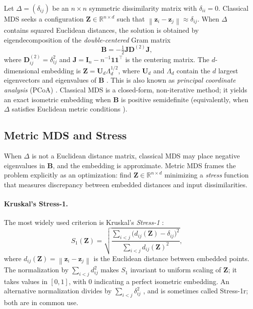 \documentclass[twoside,11pt]{article}
\newcommand{\R}{\mathbb{R}}
\newcommand{\bz}{\mathbf{z}}
\newcommand{\bZ}{\mathbf{Z}}
\newcommand{\bD}{\mathbf{D}}
\newcommand{\bB}{\mathbf{B}}
\newcommand{\bI}{\mathbf{I}}
\newcommand{\bJ}{\mathbf{J}}
\newcommand{\bU}{\mathbf{U}}
\newcommand{\norm}[1]{\left\|#1\right\|}
\newcommand{\StressOne}{S_1}
\begin{document}
Let $\Delta = (\delta_{ij})$ be an $n \times n$ symmetric dissimilarity
matrix with $\delta_{ii} = 0$.  Classical MDS
\citep{torgerson1952multidimensional, young1938discussion} seeks a
configuration $\bZ \in \R^{n \times d}$ such that
$\norm{\bz_i - \bz_j} \approx \delta_{ij}$.  When $\Delta$ contains
squared Euclidean distances, the solution is obtained by eigendecomposition
of the \emph{double-centered} Gram matrix
\begin{equation}
  \bB = -\tfrac{1}{2} \bJ \bD^{(2)} \bJ,
  \label{eq:gram}
\end{equation}
where $\bD^{(2)}_{ij} = \delta_{ij}^2$ and
$\bJ = \bI_n - n^{-1}\mathbf{1}\mathbf{1}^\top$ is the centering matrix.
The $d$-dimensional embedding is
$\bZ = \bU_d \Lambda_d^{1/2}$, where $\bU_d$ and $\Lambda_d$ contain the
$d$ largest eigenvectors and eigenvalues of $\bB$
\citep{eckart1936approximation, gower1966some}.
This is also known as \emph{principal coordinate analysis} (PCoA)
\citep{gower1966some}.  Classical MDS is a closed-form, non-iterative
method; it yields an exact isometric embedding when $\bB$ is positive
semidefinite (equivalently, when $\Delta$ satisfies Euclidean metric
conditions \citep{schoenberg1935remarks}).

\subsection{Metric MDS and Stress}
\label{sec:metric_mds}

When $\Delta$ is not a Euclidean distance matrix, classical MDS may place
negative eigenvalues in $\bB$, and the embedding is approximate.  Metric
MDS \citep{kruskal1964multidimensional} frames the problem explicitly as
an optimization: find $\bZ \in \R^{n \times d}$ minimizing a \emph{stress}
function that measures discrepancy between embedded distances and input
dissimilarities.

\paragraph{Kruskal's Stress-1.}
The most widely used criterion is Kruskal's \emph{Stress-1}
\citep{kruskal1964multidimensional}:
\begin{equation}
  \StressOne(\bZ) = \sqrt{
    \frac{\displaystyle\sum_{i < j}
          \bigl(d_{ij}(\bZ) - \delta_{ij}\bigr)^2}
         {\displaystyle\sum_{i < j} d_{ij}(\bZ)^2}
  },
  \label{eq:stress1}
\end{equation}
where $d_{ij}(\bZ) = \norm{\bz_i - \bz_j}$ is the Euclidean distance
between embedded points.  The normalization by $\sum_{i<j} d_{ij}^2$
makes $\StressOne$ invariant to uniform scaling of $\bZ$; it takes values
in $[0, 1]$, with 0 indicating a perfect isometric embedding.  An
alternative normalization divides by $\sum_{i<j} \delta_{ij}^2$
\citep{borg2005modern}, and is sometimes called Stress-1r; both are in
common use.
\end{document}
